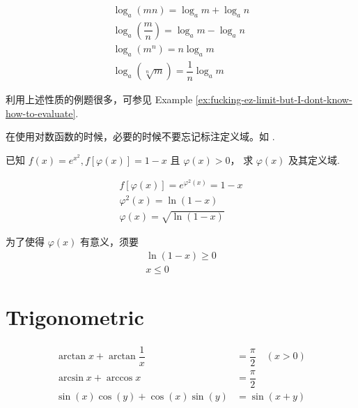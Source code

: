 \begin{theorem}
    \begin{gather}
        \label{thm-logrithmic-law-eq1} \log_a (mn) = \log_a m + \log_a n \\
        \label{thm-logrithmic-law-eq2} \log_a \left(\dfrac{m}{n}\right) = \log_a m - \log_a n \\
        \label{thm-logrithmic-law-eq3} \log_a \left(m^n\right) = n \log_a m  \\
        \label{thm-logrithmic-law-eq4} \log_a \left(\sqrt[n]{m}\right) = \dfrac{1}{n} \log_a m
    \end{gather}
\end{theorem}

利用上述性质的例题很多，可参见 Example \ref{ex:fucking-ez-limit-but-I-dont-know-how-to-evaluate}.

在使用对数函数的时候，必要的时候不要忘记标注定义域。如
\cite[page 76, pdf 87, example 2]{we}.

\begin{example}
    已知 $f(x) = e^{x^2}, f[\varphi(x)] = 1 - x$ 且 $\varphi(x) > 0$，
    求 $\varphi(x)$ 及其定义域.

    \begin{gather*}
        f[\varphi(x)] = e^{\varphi^2(x)} = 1 - x \\
        \varphi^2(x) = \ln (1-x) \\
        \varphi(x) = \sqrt{\ln (1-x)}
    \end{gather*}

    为了使得 $\varphi(x)$ 有意义，须要
    \begin{gather*}
        \ln (1 - x) \geq 0 \\
        x \leq 0
    \end{gather*}
\end{example}

\section{Trigonometric} \label{trigonometric}

\begin{corollary}
    \begin{align*}
        \arctan x + \arctan \dfrac{1}{x} &= \dfrac{\pi}{2} \quad (x > 0) \\
        \arcsin x + \arccos x &= \dfrac{\pi}{2} \\
        \sin (x) \cos (y) + \cos (x) \sin (y) &= \sin (x+y)
    \end{align*}
\end{corollary}

